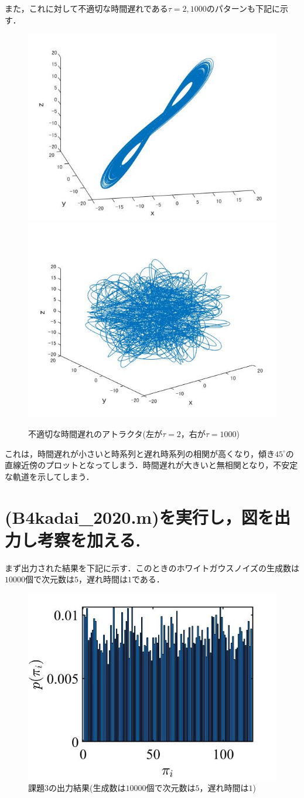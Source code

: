 \documentclass[autodetect-engine,dvipdfmx-if-dvi,ja=standard,a4paper,11pt]{bxjsarticle} %
\begin{document}
また，これに対して不適切な時間遅れである$\tau=2,1000$のパターンも下記に示す．

\begin{figure}[H]%
\begin{center}
\includegraphics[width=.4\textwidth]{kadai2_rusult3.jpg}
\includegraphics[width=.4\textwidth]{kadai2_rusult4.jpg}
\end{center}
\caption{不適切な時間遅れのアトラクタ(左が$\tau=2$，右が$\tau=1000$)}%
\label{fig:kadai24}
\end{figure}


これは，時間遅れが小さいと時系列と遅れ時系列の相関が高くなり，傾き$45^\circ$の直線近傍のプロットとなってしまう．時間遅れが大きいと無相関となり，不安定な軌道を示してしまう．

\section{(B4kadai\_2020.m)を実行し，図を出力し考察を加える.}
まず出力された結果を下記に示す．このときのホワイトガウスノイズの生成数は$10000$個で次元数は$5$，遅れ時間は$1$である．

\begin{figure}[H]%
\begin{center}
\includegraphics[width=.4\textwidth]{kadai3_rusult.jpg}
\end{center}
\caption{課題3の出力結果(生成数は$10000$個で次元数は$5$，遅れ時間は$1$)}%
\label{fig:kadai3}
\end{figure}
\end{document}

